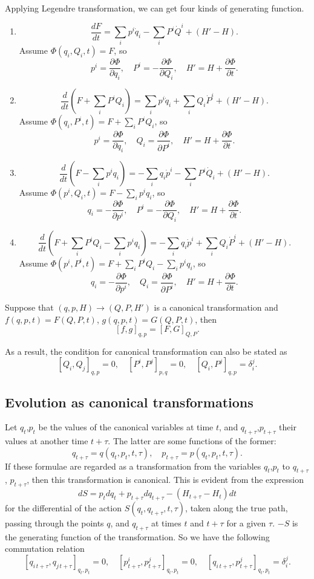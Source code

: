 Applying Legendre transformation, we can get four kinds of generating function. 
\begin{enumerate}
\item \[\frac{dF}{dt} = \sum_i p^i \dot{q}_i - \sum_i P^i \dot{Q}^i + (H'-H).\]
Assume $\Phi(q_i,Q_i,t) = F$, so
\[p^i = \frac{\partial \Phi}{\partial q_i} ,\quad P^i = -\frac{\partial \Phi}{\partial Q_i} ,\quad H' = H + \frac{\partial \Phi}{\partial t}.\]

\item \[\frac{d}{dt}(F+\sum_i P^i Q_i) = \sum_i p^i \dot{q}_i + \sum_i Q_i \dot{P}^i + (H'-H).\]
Assume $\Phi(q_i,P^i,t) = F + \sum_i P^i Q_i$, so
\[p^i = \frac{\partial \Phi}{\partial q_i} ,\quad Q_i = \frac{\partial \Phi}{\partial P^i} ,\quad H' = H + \frac{\partial \Phi}{\partial t}.\]

\item \[\frac{d}{dt}(F-\sum_i p^i q_i) = -\sum_i q_i \dot{p}^i - \sum_i P^i \dot{Q}_i + (H'-H).\]
Assume $\Phi(p^i,Q_i,t) = F - \sum_i p^i q_i$, so
\[q_i = -\frac{\partial \Phi}{\partial p^i} ,\quad P^i = -\frac{\partial \Phi}{\partial Q_i} ,\quad H' = H + \frac{\partial \Phi}{\partial t}.\]

\item \[\frac{d}{dt}(F+\sum_i P^i Q_i-\sum_i p^i q_i) = -\sum_i q_i \dot{p}^i + \sum_i Q_i \dot{P}^i + (H'-H).\]
Assume $\Phi(p^i,P^i,t) = F+\sum_i P^i Q_i-\sum_i p^i q_i$, so
\[q_i = -\frac{\partial \Phi}{\partial p^i} ,\quad Q_i = \frac{\partial \Phi}{\partial P^i} ,\quad H' = H + \frac{\partial \Phi}{\partial t}.\]
\end{enumerate}

\begin{newthem}
Suppose that $(q,p,H) \to (Q,P,H')$ is a canonical transformation and $f(q,p,t) = F(Q,P,t)$, $g(q,p,t) = G(Q,P,t)$, then
\[[f,g]_{q,p} = [F,G]_{Q,P}.\]
\end{newthem}
As a result, the condition for canonical transformation can also be stated as
\[[Q_i,Q_j]_{q,p} = 0, \quad [P^i,P^j]_{p,q} = 0, \quad [Q_i,P^j]_{q,p} = \delta_i^j.\]

\subsection{Evolution as canonical transformations}
Let $q_t$,$p_t$ be the values of the canonical variables at time $t$, and $q_{t+\tau}$,$p_{t+\tau}$ their values at another time $t+\tau$. The latter are some functions of the former:
\[q_{t+\tau} = q(q_t,p_t,t,\tau) ,\quad p_{t+\tau} = p(q_t,p_t,t,\tau).\]
If these formulae are regarded as a transformation from the variables $q_t$,$p_t$ to $q_{t+\tau}$, $p_{t+\tau}$, then this transformation is canonical. This is evident from the expression
\[dS = p_t dq_t + p_{t+\tau} dq_{t+\tau} -(H_{t+\tau}-H_t)dt \]
for the differential of the action $S(q_t,q_{t+\tau},t,\tau)$, taken along the true path, passing through the points $q$, and $q_{t+\tau}$ at times $t$ and $t+\tau$ for a given $\tau$. $-S$ is the generating function of the transformation. 
So we have the following commutation relation
\[[q_{i\,t+\tau},q_{j\,t+\tau}]_{q_t,p_t} = 0, \quad [p^i_{t+\tau},p^j_{t+\tau}]_{q_t,p_t} = 0, \quad [q_{i\,t+\tau},p^j_{t+\tau}]_{q_t,p_t} = \delta_i^j.\]

